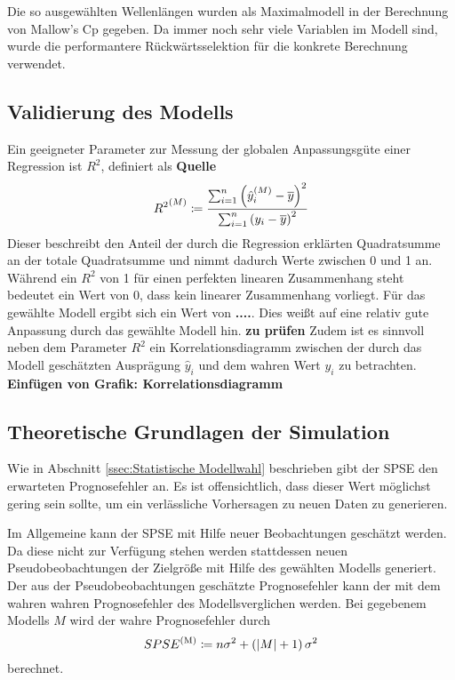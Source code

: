 	Die so ausgewählten Wellenlängen wurden als Maximalmodell in der Berechnung von Mallow's Cp gegeben. Da immer noch sehr viele Variablen im Modell sind, wurde die performantere Rückwärtsselektion für die konkrete Berechnung verwendet.


	\subsection{Validierung des Modells}
	\label{ssec:model-validation}
			Ein geeigneter Parameter zur Messung der globalen Anpassungsgüte einer Regression ist $R^2$, definiert als \textbf{Quelle}
			\[
					{R^2}^{(M)} \coloneqq \frac {\sum_{i=1}^n \left( \hat{y}^{(M)}_i - \overline{y} \right)^2}{\sum_{i=1}^n \left( y_i - \overline{y} \right)^2}
			\]
			Dieser beschreibt den Anteil der durch die Regression erklärten Quadratsumme an der totale Quadratsumme und nimmt dadurch Werte zwischen 0 und 1 an.
			Während ein $R^2$ von 1 für einen perfekten linearen Zusammenhang steht bedeutet ein Wert von 0, dass kein linearer Zusammenhang vorliegt.
			Für das gewählte Modell ergibt sich ein Wert von \textbf{....}.
			Dies weißt auf eine relativ gute Anpassung durch das gewählte Modell hin. \textbf{zu prüfen}
			Zudem ist es sinnvoll neben dem Parameter $R^2$ ein Korrelationsdiagramm zwischen der durch das Modell geschätzten Ausprägung $\hat{y}_i$ und dem wahren Wert $y_i$ zu betrachten.
			\textbf{Einfügen von Grafik: Korrelationsdiagramm}






	\subsection{Theoretische Grundlagen der Simulation}
	\label{ssec:Theoretische Grundlagen der Simulation}

        Wie in Abschnitt \ref{ssec:Statistische Modellwahl} beschrieben gibt der SPSE den erwarteten Prognosefehler an.
        Es ist offensichtlich, dass dieser Wert möglichst gering sein sollte, um ein verlässliche Vorhersagen zu neuen Daten zu generieren.

        Im Allgemeine kann der SPSE mit Hilfe neuer Beobachtungen geschätzt werden.\cite{Schumacher Skript}
        Da diese nicht zur Verfügung stehen werden stattdessen neuen Pseudobeobachtungen der Zielgröße mit Hilfe des gewählten Modells generiert.
        Der aus der Pseudobeobachtungen geschätzte Prognosefehler kann der mit dem wahren wahren Prognosefehler des Modellsverglichen werden.
        Bei gegebenem Modells $M$ wird der wahre Prognosefehler durch
        \[
            SPSE^{\mathrm{(M)}} \coloneqq  n \sigma^2 + \left( \left\vert M \right\vert+1 \right) \sigma^2
        \]
        berechnet.

